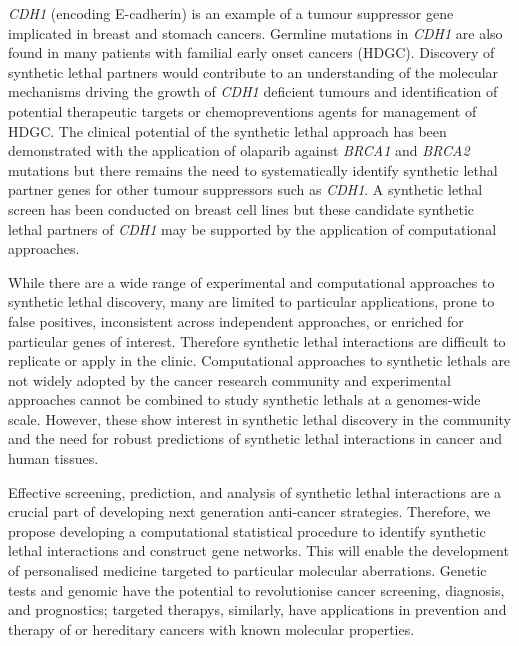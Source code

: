 \textit{CDH1} (encoding \gls{E-cadherin}) is an example of a \gls{tumour suppressor} gene implicated in  breast and stomach cancers. Germline \glspl{mutation} in \textit{CDH1} are also found in many patients with \gls{familial} early onset cancers (\gls{HDGC}). Discovery of \gls{synthetic lethal} partners would contribute to an understanding of the molecular mechanisms driving the growth of \textit{CDH1} deficient \glspl{tumour} and identification of potential therapeutic targets or \glspl{chemoprevention} agents for management of \gls{HDGC}. The clinical potential of the \gls{synthetic lethal} approach has been demonstrated with the application of olaparib against \textit{BRCA1} and \textit{BRCA2} \glspl{mutation} \citep{Lord2014} but there remains the need to systematically identify \gls{synthetic lethal} partner genes for other \glspl{tumour suppressor} such as \textit{CDH1}. A \gls{synthetic lethal} screen has been conducted on breast cell lines \citep{Telford2015} but these candidate \gls{synthetic lethal} partners of \textit{CDH1} may be supported by the application of computational approaches. %


While there are a wide range of experimental and computational approaches to \gls{synthetic lethal} discovery, many are limited to particular applications, prone to false positives, inconsistent across independent approaches, or enriched for particular genes of interest. Therefore \gls{synthetic lethal} interactions are difficult to replicate or apply in the clinic. Computational approaches to \glspl{synthetic lethal} are not widely adopted by the cancer research community and experimental approaches cannot be combined to study \glspl{synthetic lethal} at a \glspl{genome}-wide scale. However, these show interest in \gls{synthetic lethal} discovery in the community and the need for robust predictions of \gls{synthetic lethal} interactions in cancer and human tissues.

Effective screening, prediction, and analysis of \gls{synthetic lethal} interactions are a crucial part of developing next generation anti-cancer strategies. Therefore, we propose developing a computational statistical procedure to identify \gls{synthetic lethal} interactions and construct gene networks. This will enable the development of personalised medicine targeted to particular molecular aberrations. Genetic tests and \gls{genomic} have the potential to revolutionise cancer screening, diagnosis, and prognostics; \glspl{targeted therapy}, similarly, have applications in prevention and therapy of  or \gls{hereditary} cancers with known molecular properties.

